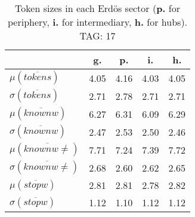 \begin{table}[h!]
\begin{center}
\begin{tabular}{| l | c | c | c | c |}\hline
 & g. & p. & i. & h. \\\hline
$\mu(\overline{tokens})$ & 4.05  & 4.16  & 4.03  & 4.05 \\\hline
$\sigma(\overline{tokens})$ & 2.71  & 2.78  & 2.71  & 2.71 \\\hline
$\mu(\overline{knownw})$ & 6.27  & 6.31  & 6.09  & 6.29 \\\hline
$\sigma(\overline{knownw})$ & 2.47  & 2.53  & 2.50  & 2.46 \\\hline
$\mu(\overline{knownw \neq})$ & 7.71  & 7.24  & 7.39  & 7.72 \\\hline
$\sigma(\overline{knownw \neq})$ & 2.68  & 2.60  & 2.62  & 2.65 \\\hline
$\mu(\overline{stopw})$ & 2.81  & 2.81  & 2.78  & 2.82 \\\hline
$\sigma(\overline{stopw})$ & 1.12  & 1.10  & 1.12  & 1.12 \\\hline
\end{tabular}
\caption{Token sizes in each Erd\"os sector ({{\bf p.}} for periphery, {{\bf i.}} for intermediary, {{\bf h.}} for hubs). TAG: 17}
\end{center}
\end{table}